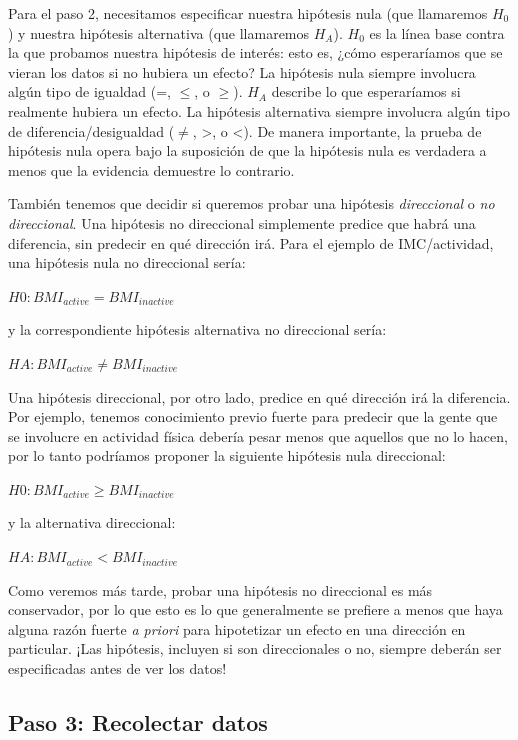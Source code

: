 \documentclass[
  12pt,
]{book}
\begin{document}
Para el paso 2, necesitamos especificar nuestra hipótesis nula (que llamaremos \(H_0\)) y nuestra hipótesis alternativa (que llamaremos \(H_A\)). \(H_0\) es la línea base contra la que probamos nuestra hipótesis de interés: esto es, ¿cómo esperaríamos que se vieran los datos si no hubiera un efecto? La hipótesis nula siempre involucra algún tipo de igualdad (=, \(\le\), o \(\ge\)). \(H_A\) describe lo que esperaríamos si realmente hubiera un efecto. La hipótesis alternativa siempre involucra algún tipo de diferencia/desigualdad (\(\ne\), \textgreater, o \textless). De manera importante, la prueba de hipótesis nula opera bajo la suposición de que la hipótesis nula es verdadera a menos que la evidencia demuestre lo contrario.

También tenemos que decidir si queremos probar una hipótesis \emph{direccional} o \emph{no direccional}. Una hipótesis no direccional simplemente predice que habrá una diferencia, sin predecir en qué dirección irá. Para el ejemplo de IMC/actividad, una hipótesis nula no direccional sería:

\(H0: BMI_{active} = BMI_{inactive}\)

y la correspondiente hipótesis alternativa no direccional sería:

\(HA: BMI_{active} \neq BMI_{inactive}\)

Una hipótesis direccional, por otro lado, predice en qué dirección irá la diferencia. Por ejemplo, tenemos conocimiento previo fuerte para predecir que la gente que se involucre en actividad física debería pesar menos que aquellos que no lo hacen, por lo tanto podríamos proponer la siguiente hipótesis nula direccional:

\(H0: BMI_{active} \ge BMI_{inactive}\)

y la alternativa direccional:

\(HA: BMI_{active} < BMI_{inactive}\)

Como veremos más tarde, probar una hipótesis no direccional es más conservador, por lo que esto es lo que generalmente se prefiere a menos que haya alguna razón fuerte \emph{a priori} para hipotetizar un efecto en una dirección en particular. ¡Las hipótesis, incluyen si son direccionales o no, siempre deberán ser especificadas antes de ver los datos!

\hypertarget{paso-3-recolectar-datos}{%
\subsection{Paso 3: Recolectar datos}\label{paso-3-recolectar-datos}}
\end{document}
